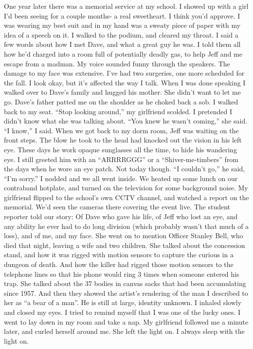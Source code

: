 \documentclass[a4paper]{article}
\begin{document}
One year later there was a memorial service at my school. I showed up with a girl I’d been seeing for a couple months- a real sweetheart. I think you’d approve. I was wearing my best suit and in my hand was a sweaty piece of paper with my idea of a speech on it.
I walked to the podium, and cleared my throat. I said a few words about how I met Dave, and what a great guy he was. I told them all how he’d charged into a room full of potentially deadly gas, to help Jeff and me escape from a madman. My voice sounded funny through the speakers. The damage to my face was extensive. I've had two surgeries, one more scheduled for the fall. I look okay, but it’s affected the way I talk.
When I was done speaking I walked over to Dave’s family and hugged his mother. She didn’t want to let me go. Dave’s father patted me on the shoulder as he choked back a sob.
I walked back to my seat. “Stop looking around,” my girlfriend scolded. I pretended I didn’t know what she was talking about.
“You knew he wasn’t coming,” she said.
“I know,” I said.
When we got back to my dorm room, Jeff was waiting on the front steps. The blow he took to the head had knocked out the vision in his left eye. These days he work opaque sunglasses all the time, to hide his wandering eye. I still greeted him with an “ARRRRGGG” or a “Shiver-me-timbers” from the days when he wore an eye patch. Not today though.
“I couldn’t go,” he said, “I’m sorry.”
I nodded and we all went inside.
We heated up some lunch on our contraband hotplate, and turned on the television for some background noise. My girlfriend flipped to the school’s own CCTV channel, and watched a report on the memorial. We’d seen the cameras there covering the event live.
The student reporter told our story: Of Dave who gave his life, of Jeff who lost an eye, and any ability he ever had to do long division (which probably wasn’t that much of a loss), and of me, and my face.
She went on to mention Officer Stanley Bell, who died that night, leaving a wife and two children.
She talked about the concession stand, and how it was rigged with motion sensors to capture the curious in a dungeon of death. And how the killer had rigged those motion sensors to the telephone lines so that his phone would ring 3 times when someone entered his trap. She talked about the 37 bodies in canvas sacks that had been accumulating since 1957.
And then they showed the artist’s rendering of the man I described to her as “a bear of a man”. He is still at large, identity unknown. I inhaled slowly and closed my eyes. I tried to remind myself that I was one of the lucky ones.
I went to lay down in my room and take a nap. My girlfriend followed me a minute later, and curled herself around me. She left the light on. I always sleep with the light on.
\end{document}
